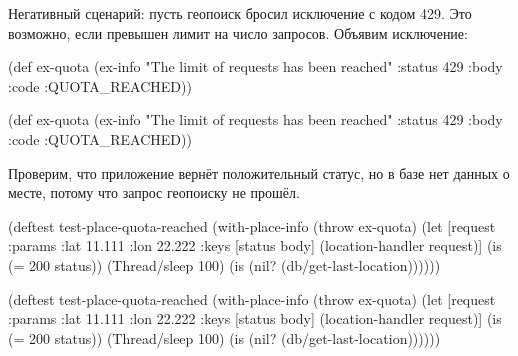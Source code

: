 \fi


Негативный сценарий: пусть геопоиск бросил исключение с кодом 429. Это
возможно, если превышен лимит на число запросов. Объявим исключение:

\ifnarrow

\begin{english}
  \begin{clojure}
(def ex-quota
  (ex-info
    "The limit of requests
               has been reached"
    {:status 429
     :body {:code :QUOTA_REACHED}}))
  \end{clojure}
\end{english}

\else

\begin{english}
  \begin{clojure}
(def ex-quota
  (ex-info "The limit of requests has been reached"
           {:status 429 :body {:code :QUOTA_REACHED}}))
  \end{clojure}
\end{english}

\fi

Проверим, что приложение вернёт положительный статус, но в базе нет данных о
месте, потому что запрос геопоиску не прошёл.

\ifnarrow

\begin{english}
  \begin{clojure}
(deftest test-place-quota-reached
 (with-place-info
   (throw ex-quota)
   (let [request {:params {:lat 11.111
                          :lon 22.222}}
        {:keys [status body]}
        (location-handler request)]
      (is (= 200 status))
      (Thread/sleep 100)
      (is (nil?
            (db/get-last-location))))))
  \end{clojure}
\end{english}

\else

\begin{english}
  \begin{clojure}
(deftest test-place-quota-reached
  (with-place-info
    (throw ex-quota)
    (let [request {:params {:lat 11.111 :lon 22.222}}
          {:keys [status
                  body]} (location-handler request)]
      (is (= 200 status))
      (Thread/sleep 100)
      (is (nil? (db/get-last-location))))))
  \end{clojure}
\end{english}

